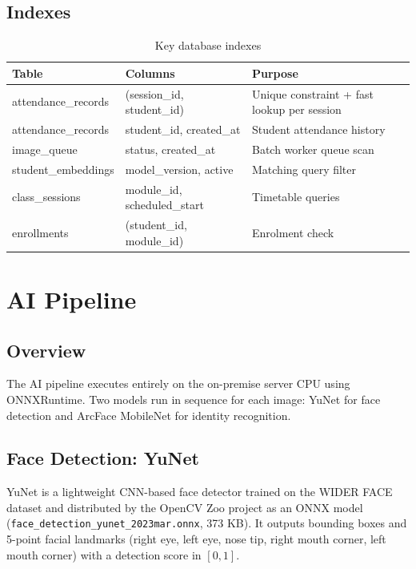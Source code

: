 \documentclass[12pt,a4paper]{report}
\begin{document}
\section{Indexes}
\begin{table}[H]
\centering\small
\caption{Key database indexes}
\begin{tabularx}{\linewidth}{llX}
\toprule
\textbf{Table} & \textbf{Columns} & \textbf{Purpose} \\
\midrule
attendance\_records & (session\_id, student\_id) & Unique constraint + fast lookup per session \\
attendance\_records & student\_id, created\_at   & Student attendance history \\
image\_queue        & status, created\_at        & Batch worker queue scan \\
student\_embeddings & model\_version, active     & Matching query filter \\
class\_sessions     & module\_id, scheduled\_start & Timetable queries \\
enrollments         & (student\_id, module\_id)  & Enrolment check \\
\bottomrule
\end{tabularx}
\end{table}

\chapter{AI Pipeline}
\label{chap:aipipeline}

\section{Overview}
The AI pipeline executes entirely on the on-premise server CPU using ONNXRuntime. Two models run in sequence for each image: YuNet for face detection and ArcFace MobileNet for identity recognition.

\section{Face Detection: YuNet}
YuNet is a lightweight CNN-based face detector trained on the WIDER FACE dataset and distributed by the OpenCV Zoo project as an ONNX model (\texttt{face\_detection\_yunet\_2023mar.onnx}, 373 KB). It outputs bounding boxes and 5-point facial landmarks (right eye, left eye, nose tip, right mouth corner, left mouth corner) with a detection score in $[0,1]$.
\end{document}
